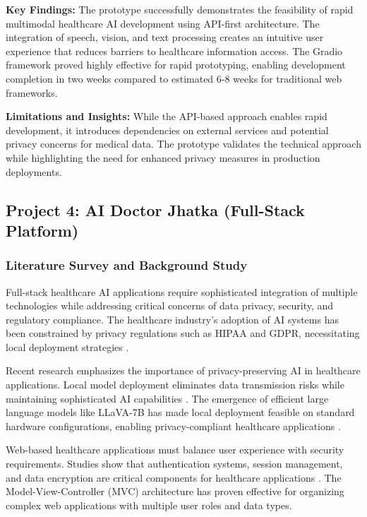 \documentclass[12pt,a4paper]{article}
\begin{document}
\textbf{Key Findings:}
The prototype successfully demonstrates the feasibility of rapid multimodal healthcare AI development using API-first architecture. The integration of speech, vision, and text processing creates an intuitive user experience that reduces barriers to healthcare information access. The Gradio framework proved highly effective for rapid prototyping, enabling development completion in two weeks compared to estimated 6-8 weeks for traditional web frameworks.

\textbf{Limitations and Insights:}
While the API-based approach enables rapid development, it introduces dependencies on external services and potential privacy concerns for medical data. The prototype validates the technical approach while highlighting the need for enhanced privacy measures in production deployments.

\subsection{Project 4: AI Doctor Jhatka (Full-Stack Platform)}

\subsubsection{Literature Survey and Background Study}
Full-stack healthcare AI applications require sophisticated integration of multiple technologies while addressing critical concerns of data privacy, security, and regulatory compliance. The healthcare industry's adoption of AI systems has been constrained by privacy regulations such as HIPAA and GDPR, necessitating local deployment strategies \citep{rajkomar2019machine}.

Recent research emphasizes the importance of privacy-preserving AI in healthcare applications. Local model deployment eliminates data transmission risks while maintaining sophisticated AI capabilities \citep{li2020federated}. The emergence of efficient large language models like LLaVA-7B has made local deployment feasible on standard hardware configurations, enabling privacy-compliant healthcare applications \citep{liu2024improved}.

Web-based healthcare applications must balance user experience with security requirements. Studies show that authentication systems, session management, and data encryption are critical components for healthcare applications \citep{zhang2021security}. The Model-View-Controller (MVC) architecture has proven effective for organizing complex web applications with multiple user roles and data types.
\end{document}
